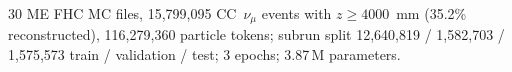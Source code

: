 30 ME FHC MC files, 15{,}799{,}095 CC~$\nu_\mu$ events with $z \ge 4000$~mm (35.2\% reconstructed), 116{,}279{,}360 particle tokens; subrun split 12{,}640{,}819 / 1{,}582{,}703 / 1{,}575{,}573 train / validation / test; 3 epochs; 3.87\,M parameters.
